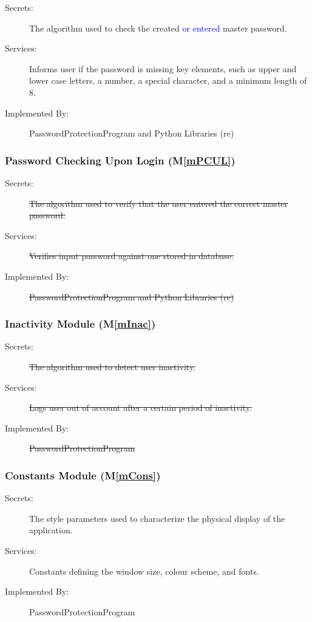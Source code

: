 \documentclass[12pt, titlepage]{article}
\newcommand{\mref}[1]{M\ref{#1}}
\begin{document}
\begin{description}
\item[Secrets:] The algorithm used to check the created \textcolor{blue}{or entered} master password.
\item[Services:] Informs user if the password is missing key elements, such as upper and lower case letters, a number, a special character, and a minimum length of 8.
\item[Implemented By:] PasswordProtectionProgram and Python Libraries (re)
\end{description}

\subsubsection{Password Checking Upon Login (\mref{mPCUL})}

\begin{description}
\item[Secrets:] \sout{The algorithm used to verify that the user entered the correct master password.}
\item[Services:] \sout{Verifies input password against one stored in database.}
\item[Implemented By:] \sout{PasswordProtectionProgram and Python Libraries (re)}
\end{description}

\subsubsection{Inactivity Module (\mref{mInac})}

\begin{description}
\item[Secrets:] \sout{The algorithm used to detect user inactivity.}
\item[Services:] \sout{Logs user out of account after a certain period of inactivity.}
\item[Implemented By:] \sout{PasswordProtectionProgram}
\end{description}

\subsubsection{Constants Module (\mref{mCons})}

\begin{description}
\item[Secrets:] The style parameters used to characterize the physical display of the application.
\item[Services:] Constants defining the window size, colour scheme, and fonts.
\item[Implemented By:] PasswordProtectionProgram
\end{description}
\end{document}
